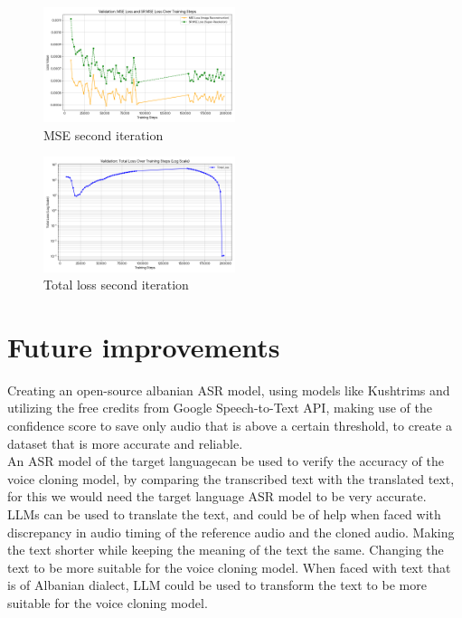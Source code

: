 \documentclass[12pt]{article}
\begin{document}
\begin{figure}[h!]
    \centering
    \includegraphics[width=0.5\textwidth]{images/MSE_v2.png}
    \caption{MSE second iteration}
    \label{img:MSE_v2}
\end{figure}

\begin{figure}[h!]
    \centering
    \includegraphics[width=0.5\textwidth]{images/total_loss_v2.png}
    \caption{Total loss second iteration}
    \label{img:total_loss_v2}
\end{figure}

\section{Future improvements}
Creating an open-source albanian ASR model, using models like Kushtrims and utilizing the free credits from Google Speech-to-Text API, making use of the confidence score to save only audio that is above a certain threshold, to create a dataset that is more accurate and reliable.\\
An ASR model of the target languagecan be used to verify the accuracy of the voice cloning model, by comparing the transcribed text with the translated text, for this we would need the target language ASR model to be very accurate.\\
LLMs can be used to translate the text, and could be of help when faced with discrepancy in audio timing of the reference audio and the cloned audio. Making the text shorter while keeping the meaning of the text the same. Changing the text to be more suitable for the voice cloning model. When faced with text that is of Albanian dialect, LLM could be used to transform the text to be more suitable for the voice cloning model.\\
\end{document}

